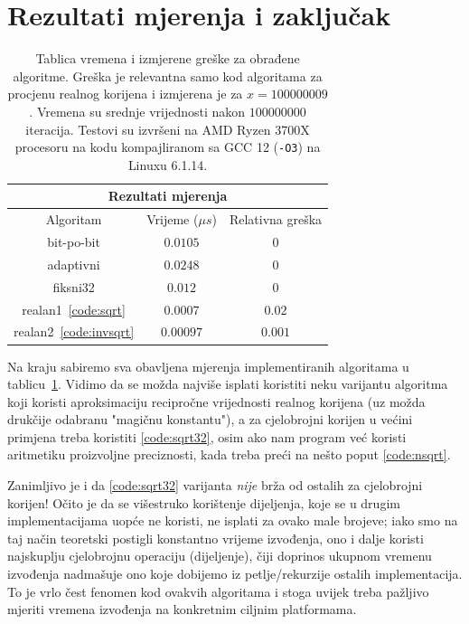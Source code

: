 \documentclass[12pt]{scrartcl}
\begin{document}
\section{Rezultati mjerenja i zaključak}
\begin{table}[t]
    \center
    \caption{Tablica vremena i izmjerene greške za obrađene algoritme. Greška je relevantna samo kod algoritama za procjenu realnog korijena i izmjerena
    je za $x=100000009$. Vremena su srednje vrijednosti nakon $100000000$ iteracija. Testovi su izvršeni na AMD Ryzen 3700X procesoru na kodu kompajliranom
    sa GCC 12 (\texttt{-O3}) na Linuxu 6.1.14.}\label{tbl}
    \begin{tabular}{|c|c|c|}
    \hline
    \multicolumn{3}{|c|}{\textbf{Rezultati mjerenja}}\\ \hline
    Algoritam & Vrijeme ($\mu s$) & Relativna greška \\ \hline\hline
    bit-po-bit & $0.0105$ & $0$ \\ \hline
    adaptivni & $0.0248$ & $0$ \\ \hline
    fiksni32 & $0.012$ & $0$ \\ \hline
    realan1~\eqref{code:sqrt} & $0.0007$ & $0.02$ \\ \hline
    realan2~\eqref{code:invsqrt} & $0.00097$ & $0.001$ \\ \hline
    \end{tabular}
\end{table}
Na kraju sabiremo sva obavljena mjerenja implementiranih algoritama u tablicu~\ref{tbl}. Vidimo da se možda najviše isplati koristiti neku varijantu
algoritma koji koristi aproksimaciju recipročne vrijednosti realnog korijena (uz možda drukčije odabranu "magičnu konstantu"), a za cjelobrojni
korijen u većini primjena treba koristiti \autoref{code:sqrt32}, osim ako nam program već koristi aritmetiku proizvoljne preciznosti, kada
treba preći na nešto poput \autoref{code:nsqrt}.

Zanimljivo je i da \autoref{code:sqrt32} varijanta \emph{nije} brža od ostalih za cjelobrojni korijen! Očito je da se višestruko korištenje dijeljenja, koje se 
u drugim implementacijama uopće ne koristi, ne isplati za ovako male brojeve; iako smo na taj način teoretski postigli konstantno vrijeme izvođenja,
ono i dalje koristi najskuplju cjelobrojnu operaciju (dijeljenje), čiji doprinos ukupnom vremenu izvođenja nadmašuje ono koje dobijemo iz petlje/rekurzije
ostalih implementacija. To je vrlo čest fenomen kod ovakvih algoritama i stoga uvijek treba pažljivo mjeriti vremena izvođenja na konkretnim ciljnim
platformama.
\end{document}
